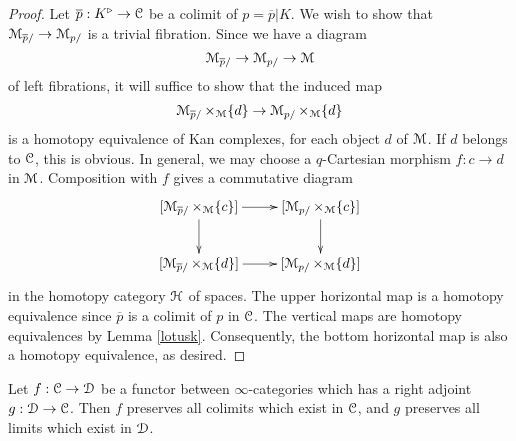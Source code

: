 \begin{proof}
Let $\overline{p}: K^{\triangleright} \rightarrow \operatorname{\mathcal{C}}$ be a colimit of $p = \overline{p}|K$.
We wish to show that $\operatorname{\mathcal{M}}_{\overline{p}/} \rightarrow \operatorname{\mathcal{M}}_{p/}$ is a trivial fibration. Since
we have a diagram
$$ \operatorname{\mathcal{M}}_{\overline{p}/} \rightarrow \operatorname{\mathcal{M}}_{p/} \rightarrow \operatorname{\mathcal{M}}$$
of left fibrations, it will suffice to show that the induced map
$$ \operatorname{\mathcal{M}}_{\overline{p}/} \times_{\operatorname{\mathcal{M}}} \{d\} \rightarrow \operatorname{\mathcal{M}}_{p/} \times_{\operatorname{\mathcal{M}}} \{d\}$$ is a homotopy
equivalence of Kan complexes, for each object $d$ of $\operatorname{\mathcal{M}}$. If $d$ belongs to
$\operatorname{\mathcal{C}}$, this is obvious. In general, we may choose a $q$-Cartesian morphism
$f: c \rightarrow d$ in $\operatorname{\mathcal{M}}$. Composition with $f$ gives a commutative
diagram
$$ \xymatrix{ [\calM_{\overline{p}/} \times_{\calM} \{c\}] \ar[r] \ar[d] & [\calM_{p/} \times_{\calM} \{c\}] \ar[d] \\
[\calM_{\overline{p}/} \times_{\calM} \{d\}] \ar[r] & [\calM_{p/} \times_{\calM} \{d\}] }$$
in the homotopy category $\operatorname{\mathcal{H}}$ of spaces. The upper horizontal map is a homotopy equivalence since $\overline{p}$ is a colimit of $p$ in $\operatorname{\mathcal{C}}$. The vertical maps are homotopy equivalences by Lemma \ref{lotusk}. Consequently, the bottom horizontal map is also a homotopy equivalence, as desired.
\end{proof}

\begin{proposition}\label{adjointcol}
Let $f: \operatorname{\mathcal{C}} \rightarrow \operatorname{\mathcal{D}}$ be a functor between $\infty$-categories which has a right
adjoint $g: \operatorname{\mathcal{D}} \rightarrow \operatorname{\mathcal{C}}$. Then $f$ preserves all colimits which exist in $\operatorname{\mathcal{C}}$, and $g$ preserves all limits which exist in $\operatorname{\mathcal{D}}$.
\end{proposition}

